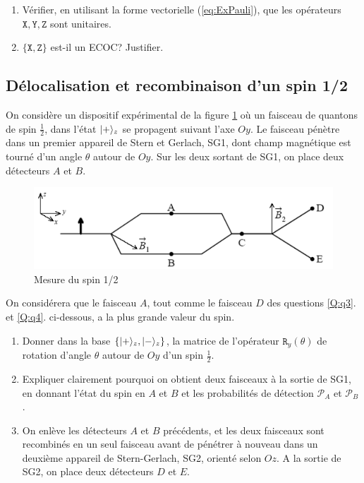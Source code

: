 \begin{itemize}
\begin{enumerate}
\item Vérifier, en utilisant la forme vectorielle (\ref{eq:ExPauli}), que les
opérateurs $\mathtt{X},\mathtt{Y},\mathtt{Z}$ sont unitaires.

\item $\{\mathtt{X},\mathtt{Z}\}$ est-il un ECOC? Justifier.
\end{enumerate}

\subsection{Délocalisation et recombinaison d'un spin 1/2}

On considère un dispositif expérimental de la figure \ref{fig:MesureSpinEx2011}
où un faisceau de quantons de spin $\frac{1}{2}$, dans l'état $\vert+\rangle_{z}$ se
propagent suivant l'axe $Oy$. Le faisceau pénètre dans un premier appareil de
Stern et Gerlach, SG1, dont champ magnétique est tourné d'un angle $\theta$
autour de $Oy$. Sur les deux sortant de SG1, on place deux détecteurs $A$ et
$B$.

\begin{figure}[htpb]
\centering
\includegraphics{graphics/SpinREXMQ2005.pdf}
\caption{Mesure du spin 1/2}
\label{fig:MesureSpinEx2011}
\end{figure}

On considérera que le faisceau $A$, tout comme le faisceau $D$ des questions
\ref{Q:q3}. et \ref{Q:q4}. ci-dessous, a la plus grande valeur du spin.

\begin{enumerate}
\item  Donner dans la base $\{\vert+\rangle_{z},\vert-\rangle_{z}\}$, la matrice de
l'opérateur $\mathtt{R}_{y}(\theta)$ de rotation d'angle $\theta$ autour de $Oy$
d'un spin $\frac{1}{2}$.

\item Expliquer clairement pourquoi on obtient deux faisceaux à la sortie de
SG1, en donnant l'état du spin en $A$ et $B$ et les probabilités de détection
$\mathcal{P}_{A}$ et $\mathcal{P}_{B}$.

\item\label{Q:q3} On enlève les détecteurs $A$ et $B$ précédents, et les deux
faisceaux sont recombinés en un seul faisceau avant de pénétrer à nouveau dans
un deuxième appareil de Stern-Gerlach, SG2, orienté selon $Oz$. A la sortie de
SG2, on place deux détecteurs $D$ et $E$.


\end{enumerate}
\end{itemize}
